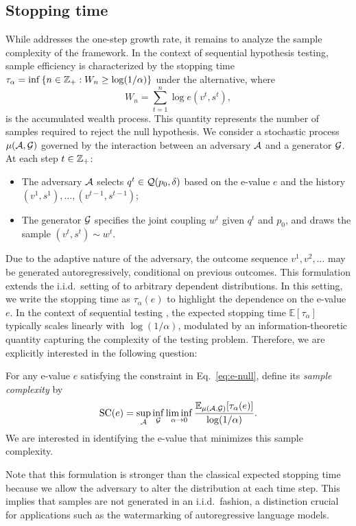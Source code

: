 \subsection{Stopping time}

While  addresses the one-step growth rate, it remains to analyze the sample complexity of the framework. In the context of sequential hypothesis testing, sample efficiency is characterized by the stopping time $\tau_\alpha = \inf\left\{n \in \mathbb{Z}_+: W_n \geq \log(1/\alpha)\right\}$ under the alternative, where $$W_n = \sum_{t=1}^{n}\log e(v^t,s^t),$$ is the accumulated wealth process. This quantity represents the number of samples required to reject the null hypothesis. We consider a stochastic process $\mu(\mathcal{A},\mathcal{G})$ governed by the interaction between an adversary $\mathcal{A}$ and a generator $\mathcal{G}$. At each step $t \in \mathbb{Z}_+$:
\begin{itemize}
    \item The adversary $\mathcal{A}$ selects $q^t \in \mathcal{Q}(p_0,\delta)$ based on the e-value $e$ and the history $(v^1,s^1),\dots,(v^{t-1},s^{t-1})$;
    \item The generator $\mathcal{G}$ specifies the joint coupling $w^t$ given $q^t$ and $p_0$, and draws the sample $(v^t,s^t) \sim w^t$.
\end{itemize}
Due to the adaptive nature of the adversary, the outcome sequence $v^1, v^2, \dots$ may be generated autoregressively, conditional on previous outcomes. This formulation extends the i.i.d.\ setting of \citet{huang2023towards} to arbitrary dependent distributions. In this setting, we write the stopping time as $\tau_\alpha(e)$ to highlight the dependence on the e-value $e$. In the context of sequential testing \citep{breimualphanu2011optimal,chugg2023auditing,shekhar2023nonparametric,kaufmann2021mixture,waudby2025universal}, the expected stopping time $\mathbb{E}[\tau_\alpha]$ typically scales linearly with $\log(1/\alpha)$, modulated by an information-theoretic quantity capturing the complexity of the testing problem. Therefore, we are explicitly interested in the following question:

\begin{problem}\label{prob:stopping-time}
For any e-value $e$ satisfying the constraint in Eq.~\eqref{eq:e-null}, define its \emph{sample complexity} by 
\begin{align*}
    \mathrm{SC}(e) = \sup_{\mathcal{A}} \inf_{\mathcal{G}} \liminf_{\alpha \to 0} \frac{\mathbb{E}_{\mu(\mathcal{A},\mathcal{G})}[\tau_\alpha(e)]}{\log(1/\alpha)}.
\end{align*}
We are interested in identifying the e-value that minimizes this sample complexity.
\end{problem}

Note that this formulation is stronger than the classical expected stopping time because we allow the adversary to alter the distribution at each time step. This implies that samples are not generated in an i.i.d.\ fashion, a distinction crucial for applications such as the watermarking of autoregressive language models.